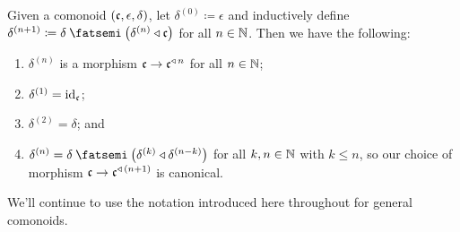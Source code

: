 \documentclass[Book-Poly]{subfiles}
\begin{document}
\begin{proposition} \label{prop.n_duplication}
Given a comonoid $(\mathfrak{c},\epsilon,\delta)$, let $\delta^{(0)}\coloneqq\epsilon$ and inductively define $\delta^{(n+1)}\coloneqq\delta\then\left(\delta^{(n)}\tri\car{c}\right)$ for all $n\in\mathbb{N}$.
Then we have the following:
\begin{enumerate}[label=(\alph*)]
    \item $\delta^{(n)}$ is a morphism $\mathfrak{c}\to\mathfrak{c}^{\mathbin{\triangleleft}\,n}$ for all $n\in\mathbb{N}$;
    \item $\delta^{(1)}=\mathrm{id}_{\mathfrak{c}}$;
    \item $\delta^{(2)}=\delta$; and
    \item $\delta^{(n)}=\delta\then\left(\delta^{(k)}\tri\delta^{(n-k)}\right)$ for all $k,n\in\mathbb{N}$ with $k\leq n$, so our choice of morphism $\mathfrak{c}\to\mathfrak{c}^{\mathbin{\triangleleft}\,(n+1)}$ is canonical. %
\end{enumerate}
\end{proposition}


We'll continue to use the notation introduced here throughout for general comonoids.
\end{document}
